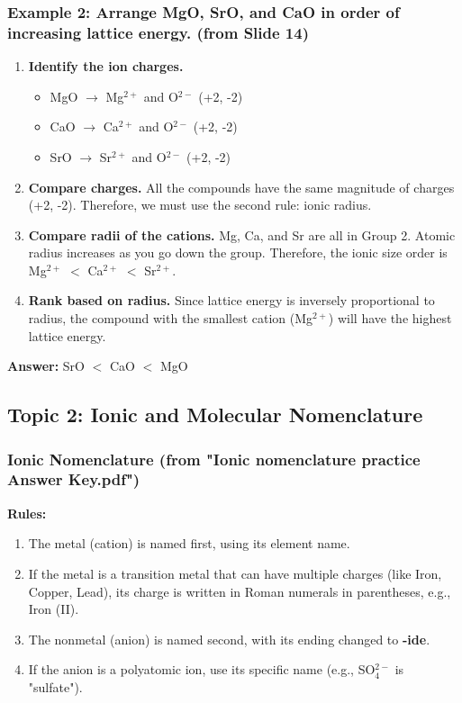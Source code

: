 \documentclass{article}
\begin{document}
\subsubsection*{Example 2: Arrange MgO, SrO, and CaO in order of increasing lattice energy. (from Slide 14)}
\begin{enumerate}[label=Step \arabic*:, itemsep=5pt]
    \item \textbf{Identify the ion charges.}
    \begin{itemize}
        \item MgO $\rightarrow$ Mg$^{2+}$ and O$^{2-}$ (+2, -2)
        \item CaO $\rightarrow$ Ca$^{2+}$ and O$^{2-}$ (+2, -2)
        \item SrO $\rightarrow$ Sr$^{2+}$ and O$^{2-}$ (+2, -2)
    \end{itemize}
    \item \textbf{Compare charges.} All the compounds have the same magnitude of charges (+2, -2). Therefore, we must use the second rule: ionic radius.
    \item \textbf{Compare radii of the cations.} Mg, Ca, and Sr are all in Group 2. Atomic radius increases as you go down the group. Therefore, the ionic size order is Mg$^{2+}$ $<$ Ca$^{2+}$ $<$ Sr$^{2+}$.
    \item \textbf{Rank based on radius.} Since lattice energy is inversely proportional to radius, the compound with the smallest cation (Mg$^{2+}$) will have the highest lattice energy.
\end{enumerate}
\textbf{Answer:} SrO $<$ CaO $<$ MgO

\bigskip
\subsection*{Topic 2: Ionic and Molecular Nomenclature}

\subsubsection*{Ionic Nomenclature (from "Ionic nomenclature practice Answer Key.pdf")}
\textbf{Rules:}
\begin{enumerate}[itemsep=5pt]
    \item The metal (cation) is named first, using its element name.
    \item If the metal is a transition metal that can have multiple charges (like Iron, Copper, Lead), its charge is written in Roman numerals in parentheses, e.g., Iron (II).
    \item The nonmetal (anion) is named second, with its ending changed to \textbf{-ide}.
    \item If the anion is a polyatomic ion, use its specific name (e.g., SO$_4^{2-}$ is "sulfate").
\end{enumerate}
\end{document}
